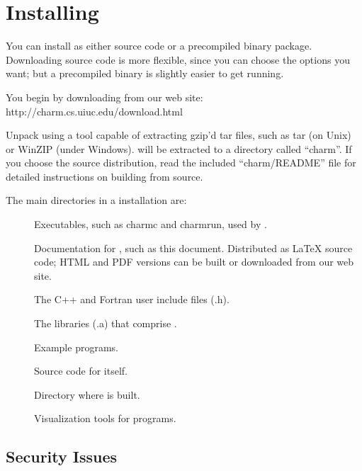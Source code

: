 \section{Installing \charmpp{}}

You can install \charmpp{} as either source code or a precompiled
binary package.  Downloading source code is more flexible, since you
can choose the options you want; but a precompiled binary is slightly
easier to get running.

You begin by downloading \charmpp{} from our web site:
	http://charm.cs.uiuc.edu/download.html

Unpack \charmpp{} using a tool capable of extracting gzip'd tar
files, such as tar (on Unix) or WinZIP (under Windows).  \charmpp{}
will be extracted to a directory called ``charm''.
If you choose the source distribution, read the included 
``charm/README'' file for detailed instructions on building \charmpp{}
from source.

The main directories in a \charmpp{} installation are:

\begin{description}
\item[]
Executables, such as charmc and charmrun,
used by \charmpp{}.

\item[]
Documentation for \charmpp{}, such as this
document.  Distributed as LaTeX source code; HTML and PDF versions
can be built or downloaded from our web site.

\item[]
The \charmpp{} C++ and Fortran user include files (.h).

\item[]
The libraries (.a) that comprise \charmpp{}.

\item[]
Example \charmpp{} programs.

\item[]
Source code for \charmpp{} itself.

\item[]
Directory where \charmpp{} is built.

\item[]
Visualization tools for \charmpp{} programs.

\end{description}


\subsection{Security Issues}

